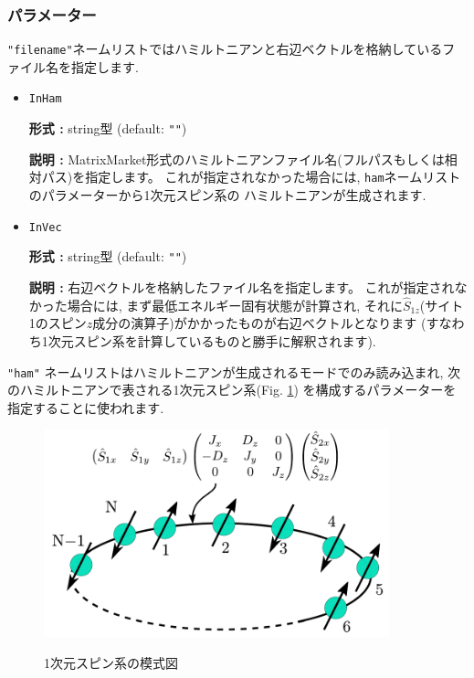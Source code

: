 \documentclass[12pt,titlepage]{jarticle}
\begin{document}
\subsubsection{パラメーター}

\verb|"filename"|ネームリストではハミルトニアンと右辺ベクトルを格納しているファイル名を指定します.

\begin{itemize}
\item \verb|InHam|
  
  {\bf 形式 :} string型 (default: \verb|""|)
  
  {\bf 説明 :} MatrixMarket形式のハミルトニアンファイル名(フルパスもしくは相対パス)を指定します。
  これが指定されなかった場合には, \verb|ham|ネームリストのパラメーターから1次元スピン系の
  ハミルトニアンが生成されます.
  
\item \verb|InVec|
  
  {\bf 形式 :} string型 (default: \verb|""|) 

  {\bf 説明 :} 右辺ベクトルを格納したファイル名を指定します。
  これが指定されなかった場合には, まず最低エネルギー固有状態が計算され,
  それに${\hat S}_{1 z}$(サイト1のスピン$z$成分の演算子)がかかったものが右辺ベクトルとなります
  (すなわち1次元スピン系を計算しているものと勝手に解釈されます).

\end{itemize}

\verb|"ham"| ネームリストはハミルトニアンが生成されるモードでのみ読み込まれ,
次のハミルトニアンで表される1次元スピン系(Fig. \ref{Fig_spin})
を構成するパラメーターを指定することに使われます.

\begin{figure}[tbp]
  \begin{center}
    \includegraphics[width=10cm]{spin.pdf}
    \label{Fig_spin}
    \caption{1次元スピン系の模式図}
  \end{center}
\end{figure}
\end{document}
